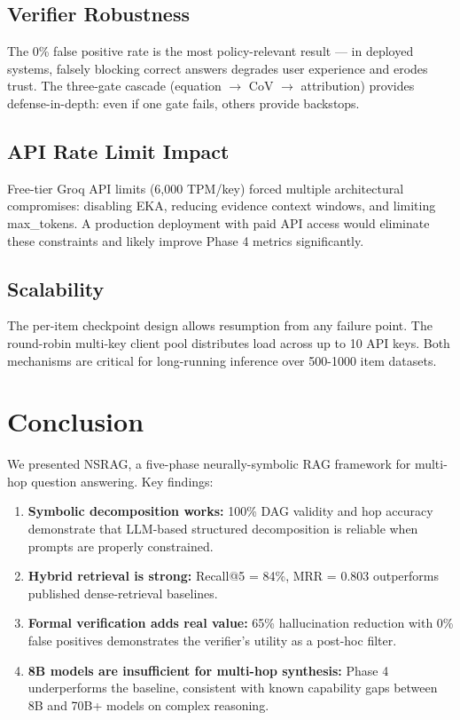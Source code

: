 \documentclass[conference]{IEEEtran}
\begin{document}
\subsection{Verifier Robustness}
The 0\% false positive rate is the most policy-relevant result — in deployed systems, falsely blocking correct answers degrades user experience and erodes trust. The three-gate cascade (equation $\rightarrow$ CoV $\rightarrow$ attribution) provides defense-in-depth: even if one gate fails, others provide backstops.

\subsection{API Rate Limit Impact}
Free-tier Groq API limits (6,000 TPM/key) forced multiple architectural compromises: disabling EKA, reducing evidence context windows, and limiting max\_tokens. A production deployment with paid API access would eliminate these constraints and likely improve Phase 4 metrics significantly.

\subsection{Scalability}
The per-item checkpoint design allows resumption from any failure point. The round-robin multi-key client pool distributes load across up to 10 API keys. Both mechanisms are critical for long-running inference over 500-1000 item datasets.

\section{Conclusion}

We presented NSRAG, a five-phase neurally-symbolic RAG framework for multi-hop question answering. Key findings:

\begin{enumerate}
    \item \textbf{Symbolic decomposition works:} 100\% DAG validity and hop accuracy demonstrate that LLM-based structured decomposition is reliable when prompts are properly constrained.
    \item \textbf{Hybrid retrieval is strong:} Recall@5 = 84\%, MRR = 0.803 outperforms published dense-retrieval baselines.
    \item \textbf{Formal verification adds real value:} 65\% hallucination reduction with 0\% false positives demonstrates the verifier's utility as a post-hoc filter.
    \item \textbf{8B models are insufficient for multi-hop synthesis:} Phase 4 underperforms the baseline, consistent with known capability gaps between 8B and 70B+ models on complex reasoning.
\end{enumerate}
\end{document}
